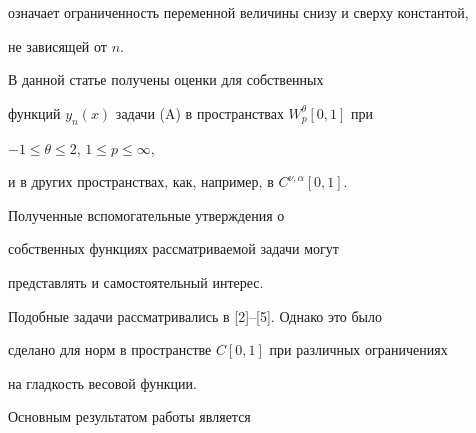 означает ограниченность переменной величины снизу и сверху константой, 


не зависящей от $n$. 


 


В данной статье получены оценки для собственных 


функций $y_n(x)$ задачи (A) в пространствах $W^\theta_p[0,1]$ при 


$-1\le\theta\le2$, $1\le p\le\infty$, 


и в других пространствах, как, например, в $C^{\nu,\alpha}[0,1]$. 


Полученные вспомогательные утверждения о 


собственных функциях рассматриваемой задачи могут 


представлять и самостоятельный интерес. 


 


Подобные задачи рассматривались в [2]--[5]. Однако это было 


сделано для норм в пространстве $C[0,1]$ при различных ограничениях 


на гладкость весовой функции. 


 


Основным результатом работы является 


 


